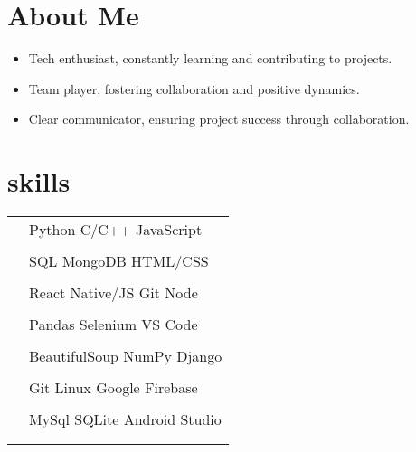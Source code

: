 \documentclass[12pt]{article}
\newcommand{\entry}[4]{{{\textbf{#1}}} \hfill #3 \\ #2 \hfill #4}
\newcommand{\tableentry}[3]{\textsc{#1} & #2\expandafter\ifstrequal\expandafter{#3}{}{\\}{\\[6pt]}}
\begin{document}
\begin{paracol}{2}
\begin{itemize}[noitemsep,leftmargin=1.5mm,rightmargin=0mm,topsep=0pt]
\end{itemize}
\smallskip




\switchcolumn
\section{About Me}

\begin{itemize}[noitemsep,leftmargin=3.5mm]
  \item Tech enthusiast, constantly learning and contributing to projects.
   \item Team player, fostering collaboration and positive dynamics.
    \item Clear communicator, ensuring project success through collaboration.
\end{itemize}

\section{skills}

\begin{supertabular}{rl}
  \tableentry{\footnotesize\faCode}{Python \textperiodcentered{} C/C++ \textperiodcentered{} JavaScript}{}
  \tableentry{}{SQL \textperiodcentered{} MongoDB\textperiodcentered{} HTML/CSS}{}

  \tableentry{\footnotesize\faFileCode}{ React Native/JS\textperiodcentered{} Git \textperiodcentered{} Node}{}
  \tableentry{}{Pandas \textperiodcentered{} Selenium \textperiodcentered{} VS Code}{}
  
  \tableentry{}{ BeautifulSoup \textperiodcentered{} NumPy \textperiodcentered{} Django}{}
  \tableentry{\footnotesize\faLaptopCode}{Git \textperiodcentered{} Linux \textperiodcentered{} Google Firebase}{}
  \tableentry{}{MySql \textperiodcentered{} SQLite \textperiodcentered{} Android Studio }{}
  

\end{supertabular}
\end{paracol}
\end{document}
